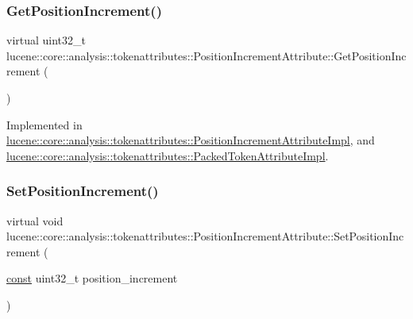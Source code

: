 \subsubsection{\texorpdfstring{Get\+Position\+Increment()}{GetPositionIncrement()}}
{\footnotesize\ttfamily virtual uint32\+\_\+t lucene\+::core\+::analysis\+::tokenattributes\+::\+Position\+Increment\+Attribute\+::\+Get\+Position\+Increment (\begin{DoxyParamCaption}{ }\end{DoxyParamCaption})\hspace{0.3cm}{\ttfamily [pure virtual]}}



Implemented in \mbox{\hyperlink{classlucene_1_1core_1_1analysis_1_1tokenattributes_1_1PositionIncrementAttributeImpl_aed9c6939240be709472fff07ea8f7059}{lucene\+::core\+::analysis\+::tokenattributes\+::\+Position\+Increment\+Attribute\+Impl}}, and \mbox{\hyperlink{classlucene_1_1core_1_1analysis_1_1tokenattributes_1_1PackedTokenAttributeImpl_aeeb6d5e17fb510c402e36d50e39bb9fb}{lucene\+::core\+::analysis\+::tokenattributes\+::\+Packed\+Token\+Attribute\+Impl}}.

\mbox{\label{classlucene_1_1core_1_1analysis_1_1tokenattributes_1_1PositionIncrementAttribute_a7d012852b01e0b16da72a911a90266b7}} 
\subsubsection{\texorpdfstring{Set\+Position\+Increment()}{SetPositionIncrement()}}
{\footnotesize\ttfamily virtual void lucene\+::core\+::analysis\+::tokenattributes\+::\+Position\+Increment\+Attribute\+::\+Set\+Position\+Increment (\begin{DoxyParamCaption}\item[{\mbox{\hyperlink{ZlibCrc32_8h_a2c212835823e3c54a8ab6d95c652660e}{const}} uint32\+\_\+t}]{position\+\_\+increment }\end{DoxyParamCaption})\hspace{0.3cm}{\ttfamily [pure virtual]}}



